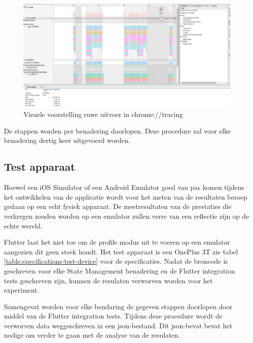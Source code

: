 \begin{figure}[H]
    \includegraphics[width=\linewidth]{img/methodologie/chrome-tracing-timeline.jpg}
    \caption{Visuele voorstelling ruwe uitvoer in chrome://tracing}
    \label{fig:chrome-tracing-timeline}
\end{figure}
De stappen worden per benadering doorlopen. Deze procedure zal voor elke benadering dertig keer uitgevoerd worden. 

\subsection{Test apparaat}
Hoewel een iOS Simulator of een Android Emulator goed van pas komen tijdens het ontwikkelen van de applicatie wordt voor het meten van de resultaten beroep gedaan op een echt fysiek apparaat. De meetresultaten van de prestaties die verkregen zouden worden op een emulator zullen verre van een reflectie zijn op de echte wereld. \autocite{Flutter2019c}

Flutter laat het niet toe om de profile modus uit te voeren op een emulator aangezien dit geen steek houdt.
Het test apparaat is een OnePlus 3T zie tabel \ref{table:specifications-test-device} voor de specificaties.
Nadat de broncode is geschreven voor elke State Management benadering en de Flutter integration tests geschreven zijn, kunnen de resulaten verworven worden voor het experiment.

Samengevat worden voor elke bendaring de gegeven stappen doorlopen door middel van de Flutter integration tests. Tijdens deze procedure wordt de verworven data weggeschreven in een json-bestand. Dit json-bevat bevat het nodige om verder te gaan met de analyse van de resulaten.

